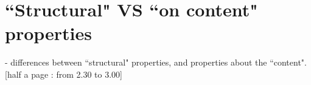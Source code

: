 \section{``Structural" VS ``on content" properties}

\label{sect:differentKindOfProperties}

- differences between ``structural" properties, and properties about the ``content".
[half a page : from 2.30 to 3.00]